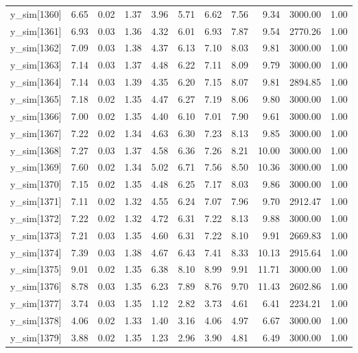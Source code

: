 \begin{table}[ht]
\begin{tabular}{rrrrrrrrrrr}
  y\_sim[1360] & 6.65 & 0.02 & 1.37 & 3.96 & 5.71 & 6.62 & 7.56 & 9.34 & 3000.00 & 1.00 \\ 
  y\_sim[1361] & 6.93 & 0.03 & 1.36 & 4.32 & 6.01 & 6.93 & 7.87 & 9.54 & 2770.26 & 1.00 \\ 
  y\_sim[1362] & 7.09 & 0.03 & 1.38 & 4.37 & 6.13 & 7.10 & 8.03 & 9.81 & 3000.00 & 1.00 \\ 
  y\_sim[1363] & 7.14 & 0.03 & 1.37 & 4.48 & 6.22 & 7.11 & 8.09 & 9.79 & 3000.00 & 1.00 \\ 
  y\_sim[1364] & 7.14 & 0.03 & 1.39 & 4.35 & 6.20 & 7.15 & 8.07 & 9.81 & 2894.85 & 1.00 \\ 
  y\_sim[1365] & 7.18 & 0.02 & 1.35 & 4.47 & 6.27 & 7.19 & 8.06 & 9.80 & 3000.00 & 1.00 \\ 
  y\_sim[1366] & 7.00 & 0.02 & 1.35 & 4.40 & 6.10 & 7.01 & 7.90 & 9.61 & 3000.00 & 1.00 \\ 
  y\_sim[1367] & 7.22 & 0.02 & 1.34 & 4.63 & 6.30 & 7.23 & 8.13 & 9.85 & 3000.00 & 1.00 \\ 
  y\_sim[1368] & 7.27 & 0.03 & 1.37 & 4.58 & 6.36 & 7.26 & 8.21 & 10.00 & 3000.00 & 1.00 \\ 
  y\_sim[1369] & 7.60 & 0.02 & 1.34 & 5.02 & 6.71 & 7.56 & 8.50 & 10.36 & 3000.00 & 1.00 \\ 
  y\_sim[1370] & 7.15 & 0.02 & 1.35 & 4.48 & 6.25 & 7.17 & 8.03 & 9.86 & 3000.00 & 1.00 \\ 
  y\_sim[1371] & 7.11 & 0.02 & 1.32 & 4.55 & 6.24 & 7.07 & 7.96 & 9.70 & 2912.47 & 1.00 \\ 
  y\_sim[1372] & 7.22 & 0.02 & 1.32 & 4.72 & 6.31 & 7.22 & 8.13 & 9.88 & 3000.00 & 1.00 \\ 
  y\_sim[1373] & 7.21 & 0.03 & 1.35 & 4.60 & 6.31 & 7.22 & 8.10 & 9.91 & 2669.83 & 1.00 \\ 
  y\_sim[1374] & 7.39 & 0.03 & 1.38 & 4.67 & 6.43 & 7.41 & 8.33 & 10.13 & 2915.64 & 1.00 \\ 
  y\_sim[1375] & 9.01 & 0.02 & 1.35 & 6.38 & 8.10 & 8.99 & 9.91 & 11.71 & 3000.00 & 1.00 \\ 
  y\_sim[1376] & 8.78 & 0.03 & 1.35 & 6.23 & 7.89 & 8.76 & 9.70 & 11.43 & 2602.86 & 1.00 \\ 
  y\_sim[1377] & 3.74 & 0.03 & 1.35 & 1.12 & 2.82 & 3.73 & 4.61 & 6.41 & 2234.21 & 1.00 \\ 
  y\_sim[1378] & 4.06 & 0.02 & 1.33 & 1.40 & 3.16 & 4.06 & 4.97 & 6.67 & 3000.00 & 1.00 \\ 
  y\_sim[1379] & 3.88 & 0.02 & 1.35 & 1.23 & 2.96 & 3.90 & 4.81 & 6.49 & 3000.00 & 1.00 \\ 

\end{tabular}
\end{table}
